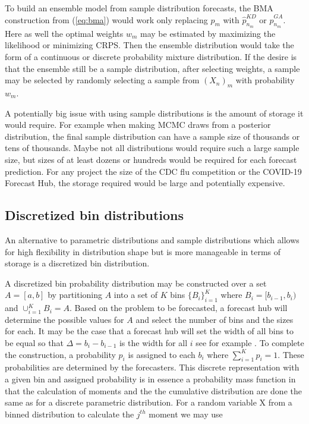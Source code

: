 \documentclass{article}\usepackage[]{graphicx}\usepackage[]{color}
\begin{document}
To build an ensemble model from sample distribution forecasts, the BMA 
construction from (\ref{eq:bma}) would work only replacing $p_m$ with 
$\hat{p}_{n_m}^{KD}$ or $\hat{p}_{n_m}^{GA}$. Here as well the optimal weights 
$w_m$ may be estimated by maximizing the likelihood or minimizing CRPS. Then 
the ensemble distribution would take the form of a continuous or discrete
probability mixture distribution. If the desire is that the ensemble still be
a sample distribution, after selecting weights, a sample may be selected by 
randomly selecting a sample from $(X_n)_m$ with probability $w_m$.

A potentially big issue with using sample distributions is the amount of storage
it would require. For example when making MCMC draws from a posterior 
distribution, the final sample distribution can have a sample size of thousands
or tens of thousands. Maybe not all distributions would require such a large 
sample size, but sizes of at least dozens or hundreds would be required for each
forecast prediction. For any project the size of the CDC flu competition or the
COVID-19 Forecast Hub, the storage required would be large and potentially 
expensive.

\subsection{Discretized bin distributions}
An alternative to parametric distributions and sample distributions which allows
for high flexibility in distribution shape but is more manageable in terms of 
storage is a discretized bin distribution.

A discretized bin probability distribution may be constructed over a set 
$A = [a, b]$ by partitioning $A$ into a set of $K$ bins $\{B_i\}_{i=1}^{K}$
where $B_i = [b_{i-1}, b_i)$ and $\cup_{i=1}^{K} B_i = A$. Based on the problem
to be forecasted, a forecast hub will determine the possible values for $A$ and 
select the number of bins and the sizes for each. It may be the case
that a forecast hub will set the width of all bins to be equal so that 
$\Delta = b_i - b_{i-1}$ is the width for all $i$ see for example
\cite{mcgowan2019collaborative}.
To complete the construction, a probability $p_i$ is assigned to each $b_i$ 
where $\sum_{i=1}^{K}p_i = 1$. These probabilities are determined by the 
forecasters. 
This discrete representation with a given bin and assigned probability is in
essence a probability mass function in that the calculation of moments and the 
the cumulative distribution are done the same as for a discrete parametric 
distribution. For a random variable X from a binned distribution to calculate
the $j^{th}$ moment we may use
\end{document}

